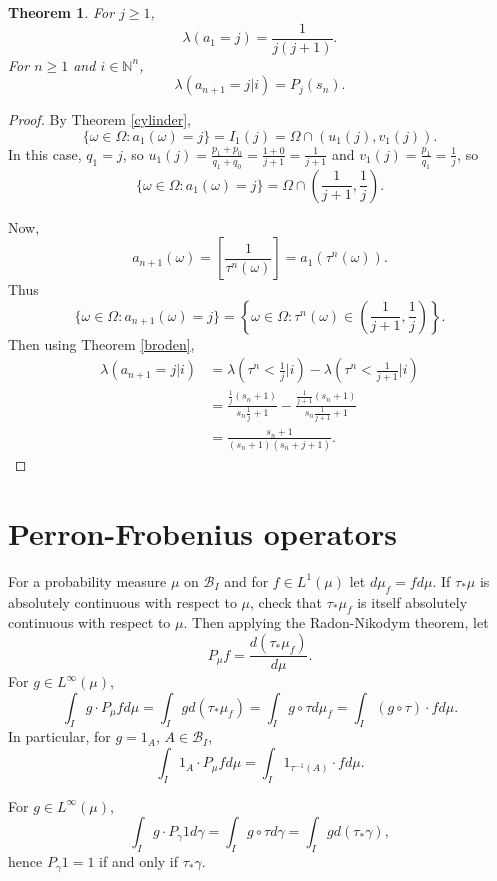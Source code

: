 \documentclass{article}
\newtheorem{theorem}{Theorem}
\theoremstyle{definition}
\begin{document}
\begin{theorem}
For $j \geq 1$,
\[
\lambda(a_1=j) = \frac{1}{j(j+1)}.
\]
For $n \geq 1$ and $i \in \mathbb{N}^n$,
\[
\lambda(a_{n+1}=j | i) = P_j(s_n).
\]
\end{theorem}
\begin{proof}
By Theorem \ref{cylinder},
\[
\{\omega \in \Omega: a_1(\omega)=j\} = I_1(j) = \Omega \cap (u_1(j), v_1(j)).
\]
In this case, $q_1=j$, so $u_1(j) = \frac{p_1+p_0}{q_1+q_0}=\frac{1+0}{j+1}
=\frac{1}{j+1}$ and
$v_1(j) = \frac{p_1}{q_1} = \frac{1}{j}$, so 
\[
\{\omega \in \Omega: a_1(\omega)=j\} = \Omega \cap \left(\frac{1}{j+1}, \frac{1}{j} \right).
\]

Now,
\[
a_{n+1}(\omega) = \left[ \frac{1}{\tau^n(\omega)} \right]
=a_1(\tau^n(\omega)).
\]
Thus
\[
\{\omega \in \Omega: a_{n+1}(\omega)=j\}
=\left\{\omega \in \Omega: \tau^n(\omega) \in \left(\frac{1}{j+1},\frac{1}{j}\right)\right\}.
\]
Then using Theorem \ref{broden},
\begin{align*}
\lambda(a_{n+1}=j|i)& = \lambda\left( \tau^n < \frac{1}{j} \big| i \right)-\lambda\left( \tau^n < \frac{1}{j+1} \big| i \right)\\
&=\frac{\frac{1}{j}(s_n+1)}{s_n \frac{1}{j} + 1}-\frac{\frac{1}{j+1}(s_n+1)}{s_n \frac{1}{j+1} + 1}\\
&=\frac{s_n+1}{(s_n+1)(s_n+j+1)}.
\end{align*}
\end{proof}



\section{Perron-Frobenius operators}
For a probability measure $\mu$ on $\mathscr{B}_I$ and for $f \in L^1(\mu)$ let
$d\mu_f = f d\mu$. 
If $\tau_*\mu$ is
absolutely continuous with respect to $\mu$, check that
$\tau_* \mu_f$ is itself absolutely continuous with respect to $\mu$. Then
applying the Radon-Nikodym theorem, let
\[
P_\mu f = \frac{d(\tau_* \mu_f)}{d\mu}.
\]
For $g \in L^\infty(\mu)$,
\[
\int_I g \cdot P_\mu f d\mu=\int_I g d(\tau_* \mu_f)
=\int_I g \circ \tau d\mu_f
=\int_I (g \circ \tau) \cdot f d\mu.
\]
In particular, for $g = 1_A$, $A \in \mathscr{B}_I$,
\[
\int_I 1_A \cdot P_\mu f d\mu = \int_I 1_{\tau^{-1}(A)} \cdot f d\mu.
\]


For $g \in L^\infty(\mu)$,
\[
\int_I g \cdot P_\gamma 1 d\gamma = \int_I g \circ \tau d\gamma
=\int_I g d(\tau_* \gamma),
\]
hence $P_\gamma 1 = 1$ if and only if $\tau_* \gamma$. 
\end{document}
